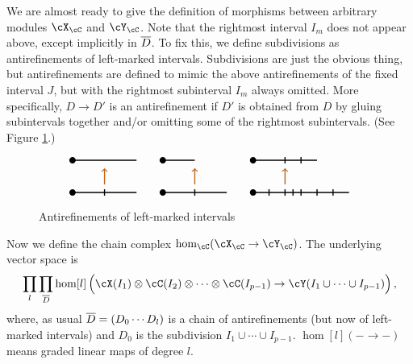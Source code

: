 We are almost ready to give the definition of morphisms between arbitrary modules
$\cX_\cC$ and $\cY_\cC$.
Note that the rightmost interval $I_m$ does not appear above, except implicitly in $\olD$.
To fix this, we define subdivisions as antirefinements of left-marked intervals.
Subdivisions are just the obvious thing, but antirefinements are defined to mimic
the above antirefinements of the fixed interval $J$, but with the rightmost subinterval $I_m$ always
omitted.
More specifically, $D\to D'$ is an antirefinement if $D'$ is obtained from $D$ by 
gluing subintervals together and/or omitting some of the rightmost subintervals.
(See Figure \ref{fig:lmar}.)
\begin{figure}[t]$$
\definecolor{arcolor}{rgb}{.75,.4,.1}
\begin{tikzpicture}
\pgfsetlinewidth{1pt}
\fill (0,0) circle (.1);
\draw (0,0) -- (2,0);
\draw (1,0.1) -- (1,-0.1);

\draw [->, arcolor] (1,0.25) -- (1,0.75);

\fill (0,1) circle (.1);
\draw (0,1) -- (2,1);
\end{tikzpicture}
\qquad
\begin{tikzpicture}
\pgfsetlinewidth{1pt}
\fill (0,0) circle (.1);
\draw (0,0) -- (2,0);
\draw (1,0.1) -- (1,-0.1);

\draw [->, arcolor] (1,0.25) -- (1,0.75);

\fill (0,1) circle (.1);
\draw (0,1) -- (1,1);
\end{tikzpicture}
\qquad
\begin{tikzpicture}
\pgfsetlinewidth{1pt}
\fill (0,0) circle (.1);
\draw (0,0) -- (3,0);
\foreach \x in {0.5, 1.0, 1.25, 1.5, 2.0, 2.5} {
	\draw (\x,0.1) -- (\x,-0.1);
}

\draw [->, arcolor] (1,0.25) -- (1,0.75);

\fill (0,1) circle (.1);
\draw (0,1) -- (2,1);
\foreach \x in {1.0, 1.5} {
	\draw (\x,1.1) -- (\x,0.9);
}

\end{tikzpicture}
$$
\caption{Antirefinements of left-marked intervals}\label{fig:lmar}\end{figure}

Now we define the chain complex $\hom_\cC(\cX_\cC \to \cY_\cC)$.
The underlying vector space is 
\[
	\prod_l \prod_{\olD} \hom[l]\left(
				\cX(I_1)\ot\cC(I_2)\ot\cdots\ot\cC(I_{p-1}) \to 
							\cY(I_1\cup\cdots\cup I_{p-1}) \rule{0pt}{1.1em}\right) ,
\]
where, as usual ${\overline D} = (D_0\cdots D_l)$ is a chain of antirefinements
(but now of left-marked intervals) and $D_0$ is the subdivision $I_1\cup\cdots\cup I_{p-1}$.
$\hom[l](- \to -)$ means graded linear maps of degree $l$.

